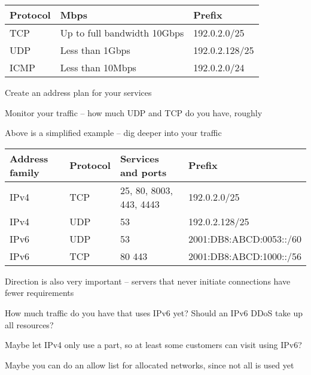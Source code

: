 \documentclass[Screen16to9,17pt]{foils}
\begin{document}

\begin{tabularx}{\textwidth-5cm}{|p{5cm}|p{7cm}|X|} \hline
{\bf Protocol} & {\bf Mbps} & {\bf Prefix}\\\hline
TCP & Up to full bandwidth 10Gbps & 192.0.2.0/25 \\\hline
UDP & Less than 1Gbps & 192.0.2.128/25 \\\hline
ICMP & Less than 10Mbps & 192.0.2.0/24 \\\hline
\end{tabularx}


\begin{list2}
\item Create an address plan for your services
\item Monitor your traffic -- how much UDP and TCP do you have, roughly

\item Above is a simplified example -- dig deeper into your traffic
\end{list2}


\begin{tabularx}{\textwidth-5cm}{|p{2cm}|p{2cm}|p{7cm}|X|} \hline
{\bf Address family} & {\bf Protocol} & {\bf Services and ports} & {\bf Prefix}\\\hline
IPv4 & TCP & 25, 80, 8003, 443, 4443 & 192.0.2.0/25 \\\hline
IPv4 & UDP & 53 & 192.0.2.128/25 \\\hline
IPv6 & UDP & 53  & 2001:DB8:ABCD:0053::/60 \\\hline
IPv6 & TCP & 80 443 & 2001:DB8:ABCD:1000::/56 \\\hline
\end{tabularx}

\begin{list2}
\item Direction is also very important -- servers that never initiate connections have fewer requirements
\item How much traffic do you have that uses IPv6 yet? Should an IPv6 DDoS take up all resources?
\item Maybe let IPv4 only use a part, so at least some customers can visit using IPv6?
\item Maybe you can do an allow list for allocated networks, since not all is used yet
\end{list2}
\end{document}
